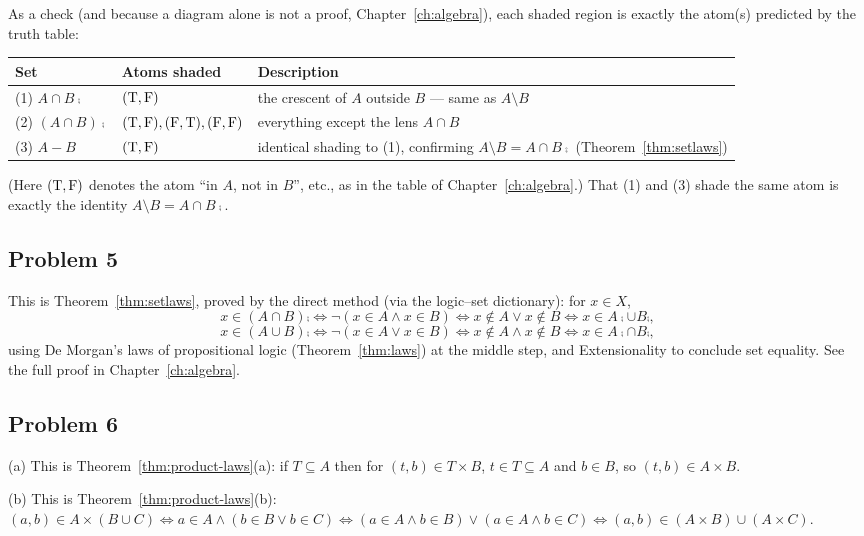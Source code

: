 As a check (and because a diagram alone is not a proof, Chapter~\ref{ch:algebra}), each shaded region is exactly the atom(s) predicted by the truth table:
\begin{center}
	\begin{tabular}{@{}p{3.6cm}p{3.6cm}p{6.4cm}@{}}
		\toprule
		\textbf{Set} & \textbf{Atoms shaded} & \textbf{Description}\\
		\midrule
		(1) $A\cap B\comp$ & $(\mathrm{T},\mathrm{F})$ & the crescent of $A$ outside $B$ — same as $A\setminus B$\\
		(2) $(A\cap B)\comp$ & $(\mathrm{T},\mathrm{F}),(\mathrm{F},\mathrm{T}),(\mathrm{F},\mathrm{F})$ & everything except the lens $A\cap B$\\
		(3) $A-B$ & $(\mathrm{T},\mathrm{F})$ & identical shading to (1), confirming $A\setminus B=A\cap B\comp$ (Theorem~\ref{thm:setlaws})\\
		\bottomrule
	\end{tabular}
\end{center}
(Here $(\mathrm{T},\mathrm{F})$ denotes the atom ``in $A$, not in $B$'', etc., as in the table of Chapter~\ref{ch:algebra}.) That (1) and (3) shade the same atom is exactly the identity $A\setminus B=A\cap B\comp$.

\subsection*{Problem 5}
This is Theorem~\ref{thm:setlaws}, proved by the direct method (via the logic--set dictionary): for $x\in X$,
\[
x\in(A\cap B)\comp\iff\neg(x\in A\wedge x\in B)\iff x\notin A\vee x\notin B\iff x\in A\comp\cup B\comp,
\]
\[
x\in(A\cup B)\comp\iff\neg(x\in A\vee x\in B)\iff x\notin A\wedge x\notin B\iff x\in A\comp\cap B\comp,
\]
using De Morgan's laws of propositional logic (Theorem~\ref{thm:laws}) at the middle step, and Extensionality to conclude set equality. See the full proof in Chapter~\ref{ch:algebra}.

\subsection*{Problem 6}
(a) This is Theorem~\ref{thm:product-laws}(a): if $T\subseteq A$ then for $(t,b)\in T\times B$, $t\in T\subseteq A$ and $b\in B$, so $(t,b)\in A\times B$.

(b) This is Theorem~\ref{thm:product-laws}(b): $(a,b)\in A\times(B\cup C)\iff a\in A\wedge(b\in B\vee b\in C)\iff(a\in A\wedge b\in B)\vee(a\in A\wedge b\in C)\iff(a,b)\in(A\times B)\cup(A\times C)$.


